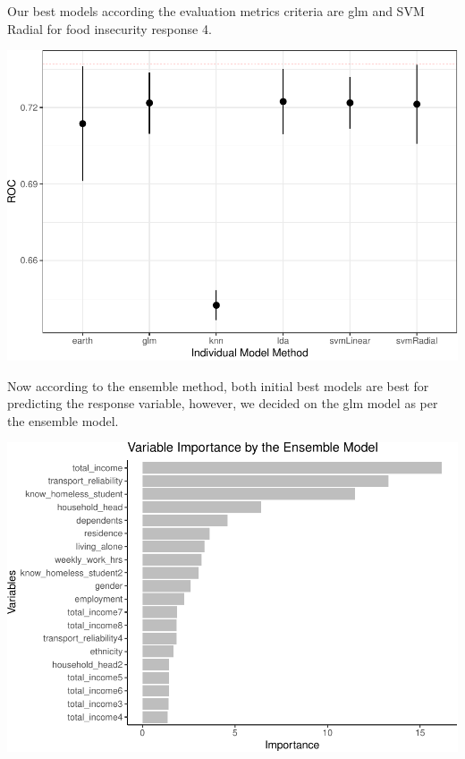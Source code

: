 \documentclass[
  10pt,
]{article}
\begin{document}
\hfill\break
Our best models according the evaluation metrics criteria are glm and SVM Radial for food insecurity response 4.\\

\begin{center}\includegraphics{phase2_report_files/figure-latex/unnamed-chunk-30-1} \end{center}

\hfill\break
Now according to the ensemble method, both initial best models are best for predicting the response variable, however, we decided on the glm model as per the ensemble model.\\

\begin{center}\includegraphics{phase2_report_files/figure-latex/unnamed-chunk-31-1} \end{center}
\end{document}
